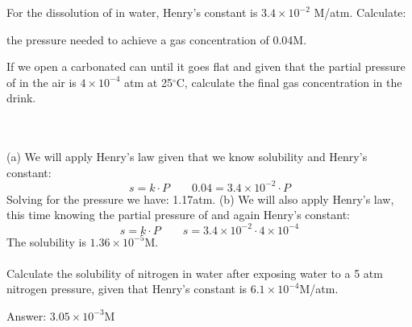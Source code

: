\documentclass[main.tex]{subfiles}
\begin{document}
\begin{example} %
For the dissolution of  in water, Henry's constant is $3.4\times 10^{-2}$ M/atm. Calculate:
\begin{inparaenum}[(a)]	
\item the  pressure needed to achieve a gas concentration of 0.04M.
\item  If we open a carbonated can until it goes flat and given that the partial pressure of  in the air is $4\times 10^{-4}$  atm at 25$^{\circ}$C, calculate the final gas concentration in the drink.
\end{inparaenum}\\
 \\
(a) We will apply Henry's law given that we know solubility and Henry's constant:
  \[	 s=k\cdot P \quad \quad  0.04=3.4\times 10^{-2}\cdot P \]
  Solving for the pressure we have: 1.17atm.
(b)  We will also apply Henry's law, this time knowing the partial pressure of  and again Henry's constant:
  \[	 s=k\cdot P \quad \quad  s=3.4\times 10^{-2}\cdot 4\times 10^{-4} \]
The solubility is $1.36\times 10^{-5}$M.\\
\faDiamond\ \\
Calculate the solubility of nitrogen in water after exposing water to a 5 atm nitrogen pressure, given that Henry's constant is $6.1\times 10^{-4}$M/atm. 
\\
\begin{flushright} Answer: $3.05\times 10^{-3}$M\end{flushright}
\end{example}%
\end{document}
